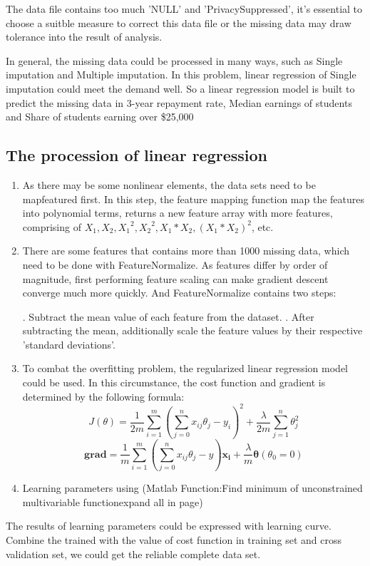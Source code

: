 	The data file contains too much 'NULL' and 'PrivacySuppressed', it's essential to choose a suitble measure to correct this data file or the missing data may draw tolerance into the result of analysis.

In general, the missing data could be processed in many ways, such as Single imputation and Multiple imputation\cite{url8}. In this problem, linear regression of Single imputation could meet the demand well. So a linear regression model is built to predict the missing data in 3-year repayment rate, Median earnings of students and Share of students earning over \$25,000
\subsection{The procession of linear regression}
\begin{enumerate}
\item As there may be some nonlinear elements, the data sets need to be mapfeatured first.
In this step, the feature mapping function map the features into polynomial terms, returns a new feature array with more features, comprising of $X_1, X_2, {X_1}^2, {X_2}^2, X_1*X_2, {(X_1*X_2)}^2$, etc.
\item There are some features that contains more than 1000 missing data, which need to be done with FeatureNormalize. As features differ by order of magnitude, first performing feature scaling can make gradient descent converge much more quickly. And FeatureNormalize contains two steps:

. Subtract the mean value of each feature from the dataset.
. After subtracting the mean, additionally scale the feature values by their respective 'standard deviations'.

\item To combat the overfitting problem, the regularized linear regression model could be used. In this circumstance, the cost function and gradient is determined by the following formula:
\begin{equation}
J(\theta) = \frac{1}{2m}\sum_{i=1}^{m}{\left(\sum_{j=0}^{n}x_{ij}\theta_j-y_i\right)}^2+\frac{\lambda}{2m}\sum_{j=1}^n\theta^2_j
\end{equation}
\begin{equation}
\boldsymbol{grad} = \frac{1}{m}\sum^m_{i=1}\left(\sum_{j=0}^{n}x_{ij}\theta_j-y\right)\boldsymbol{x_i} + \frac{\lambda}{m}\boldsymbol{\theta}(\theta_0=0)
\end{equation}

\item Learning parameters using (Matlab Function:Find minimum of unconstrained multivariable functionexpand all in page)
\end{enumerate}
The results of learning parameters could be expressed with learning curve. Combine the trained  with the value of cost function in training set and cross validation set, we could get the reliable complete data set.

